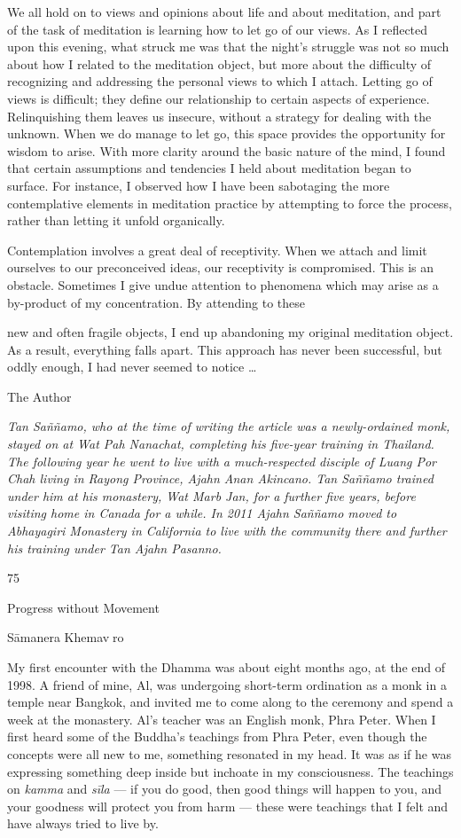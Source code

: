 We all hold on to views and opinions about life and about meditation,
and part of the task of meditation is learning how to let go of our
views. As I reflected upon this evening, what struck me was that the
night's struggle was not so much about how I related to the meditation
object, but more about the difficulty of recognizing and addressing the
personal views to which I attach. Letting go of views is difficult; they
define our relationship to certain aspects of experience. Relinquishing
them leaves us insecure, without a strategy for dealing with the
unknown. When we do manage to let go, this space provides the
opportunity for wisdom to arise. With more clarity around the basic
nature of the mind, I found that certain assumptions and tendencies I
held about meditation began to surface. For instance, I observed how I
have been sabotaging the more contemplative elements in meditation
practice by attempting to force the process, rather than letting it
unfold organically.

Contemplation involves a great deal of receptivity. When we attach and
limit ourselves to our preconceived ideas, our receptivity is
compromised. This is an obstacle. Sometimes I give undue attention to
phenomena which may arise as a by-product of my concentration. By
attending to these

new and often fragile objects, I end up abandoning my original
meditation object. As a result, everything falls apart. This approach
has never been successful, but oddly enough, I had never seemed to
notice \ldots{}

The Author

\emph{Tan Saññamo, who at the time of writing the article was a
newly-ordained monk, stayed on at Wat Pah Nanachat, completing his
five-year training in Thailand. The following year he went to live with
a much-respected disciple of Luang Por Chah living in Rayong Province,
Ajahn Anan Akincano. Tan Saññamo trained under him at his monastery, Wat
Marb Jan, for a further five years, before visiting home in Canada for a
while. In 2011 Ajahn Saññamo moved to Abhayagiri Monastery in California
to live with the community there and further his training under Tan
Ajahn Pasanno.}

75

Progress without Movement

Sāmanera Khemavro

My first encounter with the Dhamma was about eight months ago, at the
end of 1998. A friend of mine, Al, was undergoing short-term ordination
as a monk in a temple near Bangkok, and invited me to come along to the
ceremony and spend a week at the monastery. Al's teacher was an English
monk, Phra Peter. When I first heard some of the Buddha's teachings from
Phra Peter, even though the concepts were all new to me, something
resonated in my head. It was as if he was expressing something deep
inside but inchoate in my consciousness. The teachings on \emph{kamma}
and \emph{sīla} --- if you do good, then good things will happen to you,
and your goodness will protect you from harm --- these were teachings
that I felt and have always tried to live by.

